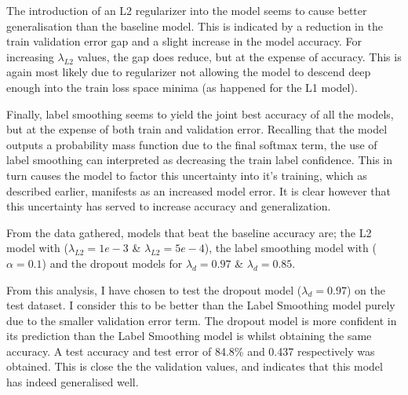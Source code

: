 {{The introduction of an L2 regularizer into the model seems to cause better generalisation than the baseline model. This is indicated by a reduction in the train validation error gap and a slight increase in the model accuracy. For increasing $\lambda_{L2}$ values, the gap does reduce, but at the expense of accuracy. This is again most likely due to regularizer not allowing the model to descend deep enough into the train loss space minima (as happened for the L1 model).

Finally, label smoothing seems to yield the joint best accuracy of all the models, but at the expense of both train and validation error. Recalling that the model outputs a probability mass function due to the final softmax term, the use of label smoothing can interpreted as decreasing the train label confidence. This in turn causes the model to factor this uncertainty into it's training, which as described earlier, manifests as an increased model error. It is clear however that this uncertainty has served to increase accuracy and generalization.

From the data gathered, models that beat the baseline accuracy are; the L2 model with ($\lambda_{L2} = 1e-3$ \& $\lambda_{L2} = 5e-4$), the label smoothing model with ($\alpha = 0.1$) and the dropout models for $\lambda_d = 0.97$ \& $\lambda_d = 0.85$.

From this analysis, I have chosen to test the dropout model ($\lambda_d = 0.97$) on the test dataset. I consider this to be better than the Label Smoothing model purely due to the smaller validation error term. The dropout model is more confident in its prediction than the Label Smoothing model is whilst obtaining the same accuracy. A test accuracy and test error of 84.8\% and 0.437 respectively was obtained. This is close the the validation values, and indicates that this model has indeed generalised well. 


}
}

